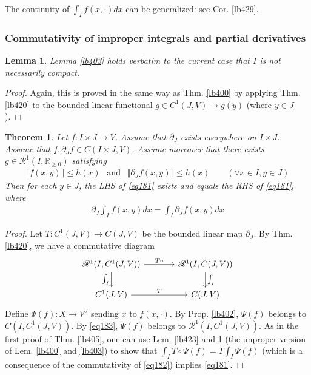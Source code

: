\documentclass[12pt,b5paper,notitlepage]{article}
\theoremstyle{definition}
\theoremstyle{plain}
\newtheorem{thm}[df]{Theorem}
\newtheorem{lm}[df]{Lemma}
\newcommand{\scr}{\mathscr}
\newcommand{\Rbb}{\mathbb R}
\numberwithin{equation}{section}
\begin{document}
The continuity of $\int_If(x,\cdot)dx$ can be generalized: see Cor. \ref{lb429}.



\subsubsection{Commutativity of improper integrals and partial derivatives}


\begin{lm}\label{lb426}
Lemma \ref{lb403} holds verbatim to the current case that $I$ is not necessarily compact.
\end{lm}

\begin{proof}
Again, this is proved in the same way as Thm. \ref{lb400} by applying Thm. \ref{lb420} to the bounded linear functional $g\in C^1(J,V)\rightarrow g(y)$ (where $y\in J$).
\end{proof}


\begin{thm}\label{lb434}
Let $f:I\times J\rightarrow V$. Assume that $\partial_J$ exists everywhere on $I\times J$. Assume that $f,\partial_J f\in C(I\times J,V)$. Assume moreover that there exists $g\in\scr R^1(I,\Rbb_{\geq0})$ satisfying
\begin{align}\label{eq183}
\Vert f(x,y)\Vert\leq h(x)~~\text{ and }~~\Vert\partial_Jf(x,y)\Vert\leq h(x)\qquad(\forall x\in I,y\in J)
\end{align}
Then for each $y\in J$, the LHS of \eqref{eq181} exists and equals the RHS of \eqref{eq181}, where
\begin{align}
\partial_J\int_I f(x,y)dx=\int_I\partial_J f(x,y)dx  \label{eq181}
\end{align}
\end{thm}


\begin{proof}
Let $T:C^1(J,V)\rightarrow C(J,V)$ be the bounded linear map $\partial_J$. By Thm. \ref{lb420}, we have a commutative diagram
\begin{equation}\label{eq182}
\begin{tikzcd}[column sep=large]
\scr R^1(I,C^1(J,V)) \arrow[r,"T\circ"] \arrow[d,"\int_I"'] & \scr R^1(I,C(J,V)) \arrow[d,"\int_I"] \\
C^1(J,V) \arrow[r,"T"]           & C(J,V)      
\end{tikzcd} 
\end{equation}
Define $\Psi(f):X\rightarrow V^J$ sending $x$ to $f(x,\cdot)$. By Prop. \ref{lb402}, $\Psi(f)$ belongs to $C(I,C^1(J,V))$. By \eqref{eq183}, $\Psi(f)$ belongs to $\scr R^1(I,C^1(J,V))$. As in the first proof of Thm. \ref{lb405}, one can use Lem. \ref{lb423} and  \ref{lb426} (the improper version of Lem. \ref{lb400} and \ref{lb403}) to show that  $\int_I T\circ\Psi(f)=T\int_I\Psi(f)$ (which is a consequence of the commutativity of \eqref{eq182}) implies \eqref{eq181}.
\end{proof}
\end{document}
